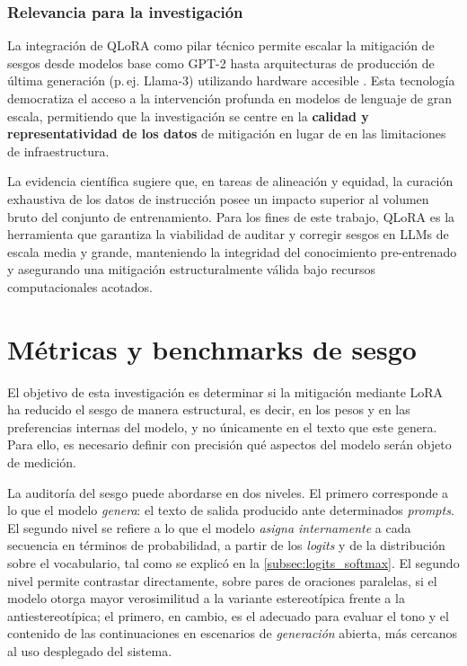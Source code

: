\documentclass[12pt,a4paper]{report}
\begin{document}
\subsubsection{Relevancia para la investigación}
\label{par:resultados_qlora}

La integración de QLoRA como pilar técnico permite escalar la mitigación de sesgos desde modelos base como GPT-2 hasta arquitecturas de producción de última generación (p.\,ej. Llama-3) utilizando hardware accesible \cite{dettmers_qlora_2023,raza_developing_2025,pratap_fine_2025}. Esta tecnología democratiza el acceso a la intervención profunda en modelos de lenguaje de gran escala, permitiendo que la investigación se centre en la \textbf{calidad y representatividad de los datos} de mitigación en lugar de en las limitaciones de infraestructura.

La evidencia científica sugiere que, en tareas de alineación y equidad, la curación exhaustiva de los datos de instrucción posee un impacto superior al volumen bruto del conjunto de entrenamiento. Para los fines de este trabajo, QLoRA es la herramienta que garantiza la viabilidad de auditar y corregir sesgos en LLMs de escala media y grande, manteniendo la integridad del conocimiento pre-entrenado y asegurando una mitigación estructuralmente válida bajo recursos computacionales acotados.

\section{Métricas y benchmarks de sesgo}
\label{sec:metricas_benchmarks}

El objetivo de esta investigación es determinar si la mitigación mediante LoRA ha reducido el sesgo de manera estructural, es decir, en los pesos y en las preferencias internas del modelo, y no únicamente en el texto que este genera. Para ello, es necesario definir con precisión qué aspectos del modelo serán objeto de medición.

La auditoría del sesgo puede abordarse en dos niveles. El primero corresponde a lo que el modelo \emph{genera}: el texto de salida producido ante determinados \emph{prompts}. El segundo nivel se refiere a lo que el modelo \emph{asigna internamente} a cada secuencia en términos de probabilidad, a partir de los \emph{logits} y de la distribución sobre el vocabulario, tal como se explicó en la \autoref{subsec:logits_softmax}. El segundo nivel permite contrastar directamente, sobre pares de oraciones paralelas, si el modelo otorga mayor verosimilitud a la variante estereotípica frente a la antiestereotípica; el primero, en cambio, es el adecuado para evaluar el tono y el contenido de las continuaciones en escenarios de \textit{generación} abierta, más cercanos al uso desplegado del sistema.
\end{document}
